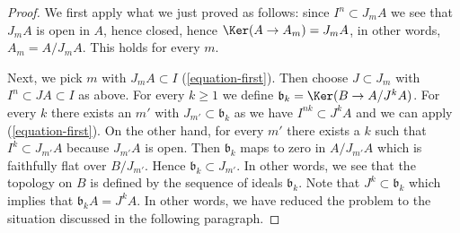 \begin{proof}
\medskip\noindent
We first apply what we just proved as follows:
since $I^n \subset J_mA$ we see that
$J_mA$ is open in $A$, hence closed, hence $\Ker(A \to A_m) = J_mA$,
in other words, $A_m = A/J_mA$. This holds for every $m$.

\medskip\noindent
Next, we pick $m$ with $J_mA \subset I$ (\ref{equation-first}).
Then choose $J \subset J_m$ with $I^n \subset JA \subset I$ as above.
For every $k \geq 1$ we define $\mathfrak b_k = \Ker(B \to A/J^kA)$.
For every $k$ there exists
an $m'$ with $J_{m'} \subset \mathfrak b_k$ as we have
$I^{nk} \subset J^kA$ and we can apply (\ref{equation-first}).
On the other hand, for every $m'$ there exists a $k$ such that
$I^k \subset J_{m'}A$ because $J_{m'}A$ is open. Then
$\mathfrak b_k$ maps to zero in $A/J_{m'}A$ which is faithfully
flat over $B/J_{m'}$. Hence $\mathfrak b_k \subset J_{m'}$.
In other words, we see that the topology on $B$ is defined by the
sequence of ideals $\mathfrak b_k$. Note that $J^k \subset \mathfrak b_k$
which implies that $\mathfrak b_k A = J^kA$.
In other words, we have reduced the problem to the
situation discussed in the following paragraph.


\end{proof}

